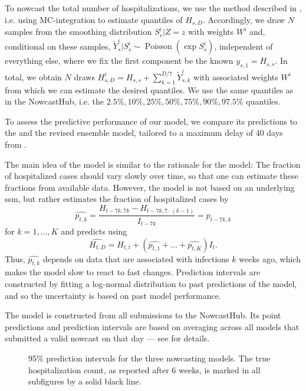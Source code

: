To nowcast the total number of hospitalizations, we use the method described in , i.e. using MC-integration to estimate quantiles of $H_{s, D}$. Accordingly, we draw $N$ samples from the smoothing distribution $S^{i}_{s} | Z = z$ with weights $W^{i}$ and, conditional on these samples, $\tilde Y^{i}_{s} | S^{i}_s \sim \operatorname{Poisson} \left( \exp S^{i}_s \right)$, independent of everything else, where we fix the first component be the known $y_{s,1} = H_{s,s}$. In total, we obtain $N$ draws $H^{i}_{s,D} = H_{s,s} + \sum_{k = 1}^{D / 7} \tilde Y^{i}_{s,k}$ with associated weights $W^{i}$ from which we can estimate the desired quantiles. We use the same quantiles as in the NowcastHub, i.e. the $2.5\%, 10\%, 25\%, 50\%, 75\%, 90\%, 97.5\%$ quantiles. 

To assess the predictive performance of our model, we compare its predictions to the \ilmprop and the revised ensemble model, \ensemble tailored to a maximum delay of 40 days from \citep[Section 3.7]{Wolffram2023Collaborative}. 

The main idea of the \ilmprop model is similar to the rationale for the \ssm model: The fraction of hospitalized cases should vary slowly over time, so that one can estimate these fractions from available data. However, the \ilmprop model is not based on an underlying \acrshort{ssm}, but rather estimates the fraction of hospitalized cases by 
$$
\widehat {p_{t,k}} = \frac{H_{t - 7k, 7k} - H_{t - 7k, 7\cdot(k - 1)}}{I_{t - 7k}} = p_{t - 7k,k}
$$
for $k = 1, \dots, K$ and predicts using 
$$
\widehat{H_{t,D}} = H_{t,t} + \left(\widehat{p_{t,1}} + \dots + \widehat{p_{t,K}}\right)  I_{t}.
$$
Thus, $\widehat{p_{t,k}}$ depends on data that are associated with infections $k$ weeks ago, which makes the model slow to react to fast changes. 
Prediction intervals are constructed by fitting a log-normal distribution to past predictions of the model, and so the uncertainty is based on past model performance. 

The \ensemble model is constructed from all submissions to the NowcastHub. Its point predictions and prediction intervals are based on averaging across all models that submitted a valid nowcast on that day --- see \citep{Wolffram2023Collaborative} for details.

\begin{figure}
    \centering
    \resizebox{\textwidth}{!}{}
    \caption{95\% prediction intervals for the three nowcasting models. The true hospitalization count, as reported after 6 weeks, is marked in all subfigures by a solid black line.}
    \label{fig:hospitalization_nowcasts_all_models}
\end{figure}


